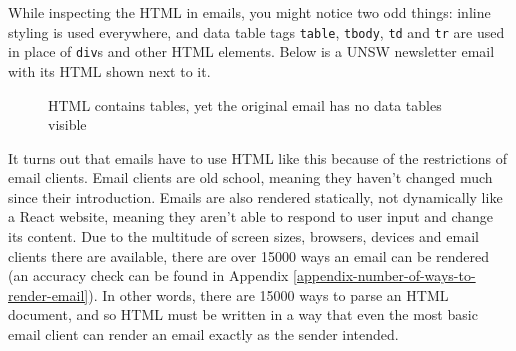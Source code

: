 \documentclass{article}
\begin{document}
While inspecting the HTML in emails, you might notice two odd things: inline styling is used everywhere, and data table tags \texttt{table}, \texttt{tbody}, \texttt{td} and \texttt{tr} are used in place of \texttt{div}s and other HTML elements. Below is a UNSW newsletter email with its HTML shown next to it.

\begin{figure}[H]
    \centering
    \qquad
    \caption{HTML contains tables, yet the original email has no data tables visible}
\end{figure}

It turns out that emails have to use HTML like this because of the restrictions of email clients. Email clients are old school, meaning they haven't changed much since their introduction. Emails are also rendered statically, not dynamically like a React website, meaning they aren't able to respond to user input and change its content. Due to the multitude of screen sizes, browsers, devices and email clients there are available, there are over 15000 ways an email can be rendered (an accuracy check can be found in Appendix \ref{appendix-number-of-ways-to-render-email}). In other words, there are 15000 ways to parse an HTML document, and so HTML must be written in a way that even the most basic email client can render an email exactly as the sender intended.
\end{document}

